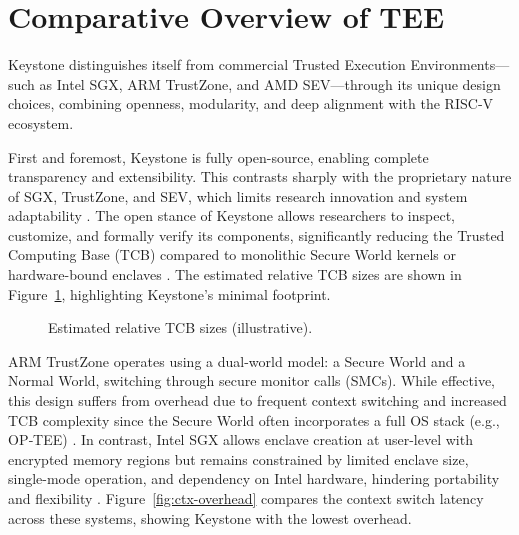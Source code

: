\section{Comparative Overview of TEE}
\label{sec:comparison_tees}

Keystone distinguishes itself from commercial Trusted Execution Environments—such as Intel SGX, ARM TrustZone, and AMD SEV—through its unique design choices, combining openness, modularity, and deep alignment with the RISC‑V ecosystem.

First and foremost, Keystone is fully open-source, enabling complete transparency and extensibility. This contrasts sharply with the proprietary nature of SGX, TrustZone, and SEV, which limits research innovation and system adaptability \cite{suzaki2021tsperf}. The open stance of Keystone allows researchers to inspect, customize, and formally verify its components, significantly reducing the Trusted Computing Base (TCB) compared to monolithic Secure World kernels or hardware-bound enclaves \cite{suzaki2021tsperf}. The estimated relative TCB sizes are shown in Figure~\ref{fig:tcb-size}, highlighting Keystone's minimal footprint.

\begin{figure}[htbp]
\centering
{}
\caption{Estimated relative TCB sizes (illustrative).}
\label{fig:tcb-size}
\end{figure}

ARM TrustZone operates using a dual-world model: a Secure World and a Normal World, switching through secure monitor calls (SMCs). While effective, this design suffers from overhead due to frequent context switching and increased TCB complexity since the Secure World often incorporates a full OS stack (e.g., OP‑TEE) \cite{suzaki2021tsperf}. In contrast, Intel SGX allows enclave creation at user-level with encrypted memory regions but remains constrained by limited enclave size, single-mode operation, and dependency on Intel hardware, hindering portability and flexibility \cite{suzaki2021tsperf}. Figure~\ref{fig:ctx-overhead} compares the context switch latency across these systems, showing Keystone with the lowest overhead.

